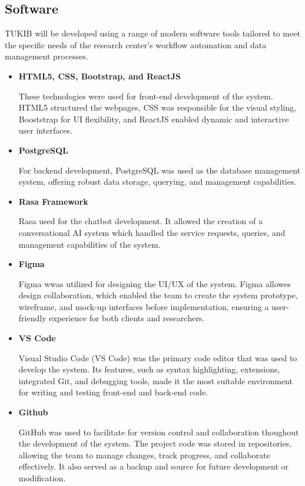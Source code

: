 \subsection{Software}

TUKIB will be developed using a range of modern software tools tailored to meet the specific needs of the research center’s workflow automation and data management processes.

\begin{itemize}
	\item \textbf{HTML5, CSS, Bootstrap, and ReactJS}
	
	These technologies were used for front-end development of the system. HTML5 structured the webpages, CSS was responsible for the visual styling, Booststrap for UI $ $flexibility, and ReactJS enabled dynamic and interactive user interfaces.
	
	\item \textbf{PostgreSQL}
	
	For backend development, PostgreSQL was used as the database management system, offering robust data storage, querying, and management capabilities.
	
	\item \textbf{Rasa Framework}
	
	Rasa used for the chatbot development. It allowed the creation of a conversational AI system which handled the service requests, queries, and management capabilities of the system.
	
	\item \textbf{Figma}
	
	Figma wwas utilized for designing the UI/UX of the system. Figma allowes design collaboration, which enabled the team to create the system prototype, wireframe, and mock-up interfaces before implementation, ensuring a user-friendly experience for both clients and researchers.
	
	\item \textbf{VS Code}
	
	Visual Studio Code (VS Code) was the primary code editor that was used to develop the system. Its features, such as syntax highlighting, extensions, integrated Git, and debugging tools, made it the most suitable environment for writing and testing front-end and back-end code.
	
	\item \textbf{Github}
	
	GitHub was used to facilitate for version control and collaboration thoughout the development of the system. The project code was stored in repositories, allowing the team to manage changes, track progress, and collaborate effectively. It also served as a backup and source for future development or modification.
	
\end{itemize}
